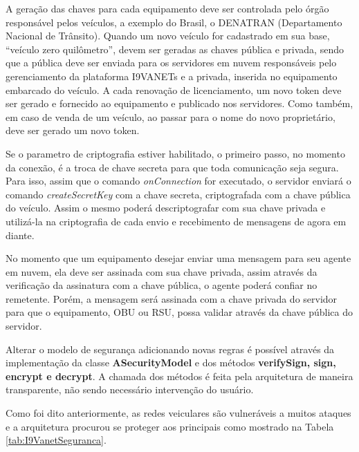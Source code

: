 \documentclass[
	12pt,				%
	oneside,			%
	a4paper,			%
	english,			%
	brazil				%
	]{abntex2ppgsi}
\begin{document}
A geração das chaves para cada equipamento deve ser controlada pelo órgão responsável pelos veículos, a exemplo do Brasil, o DENATRAN (Departamento Nacional de Trânsito). Quando um novo veículo for cadastrado em sua base, ``veículo zero quilômetro'', devem ser geradas as chaves pública e privada, sendo que a pública deve ser enviada para os servidores em nuvem  responsáveis  pelo gerenciamento da plataforma I9VANETs e a privada, inserida no equipamento embarcado do veículo. A cada renovação de licenciamento, um novo token deve ser gerado e fornecido ao equipamento e publicado nos servidores. Como também, em caso de venda de um veículo, ao passar para o nome do novo proprietário, deve ser gerado um novo token.

Se o parametro de criptografia estiver habilitado, o primeiro passo, no momento da conexão, é a troca de chave secreta para que toda comunicação seja segura. Para isso, assim que o comando \textit{onConnection} for executado, o servidor enviará o comando \textit{createSecretKey} com a chave secreta, criptografada com a chave pública do veículo. Assim o mesmo poderá descriptografar com sua chave privada e utilizá-la na criptografia de cada envio e recebimento de mensagens de agora em diante. 

No momento que um equipamento desejar enviar uma mensagem para seu agente em nuvem, ela deve ser assinada com sua chave privada, assim através da verificação da assinatura com a chave pública, o agente poderá confiar no remetente. Porém, a mensagem será assinada com a chave privada do servidor para que o equipamento, OBU ou RSU, possa validar através da chave pública do servidor.


Alterar o modelo de segurança adicionando novas regras é possível através da implementação da classe \textbf{ASecurityModel} e dos métodos \textbf{verifySign, sign, encrypt e decrypt}. A chamada dos métodos é feita pela arquitetura de maneira transparente, não sendo necessário intervenção do usuário.

Como foi dito anteriormente,  as redes veiculares são vulneráveis a muitos ataques e a arquitetura procurou se proteger aos principais como mostrado na Tabela \ref{tab:I9VanetSeguranca}.
\end{document}
